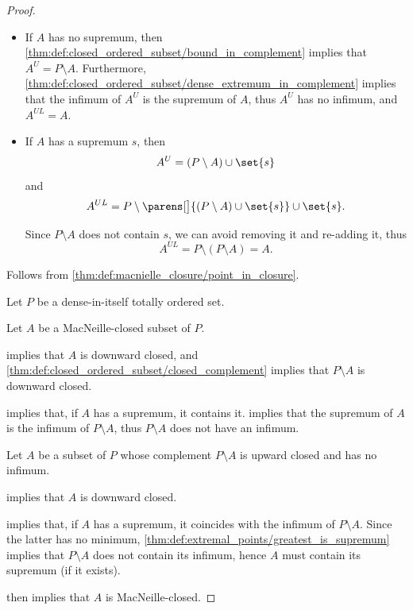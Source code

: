 \begin{proof}
  \begin{itemize}
    \item If \( A \) has no supremum, then \cref{thm:def:closed_ordered_subset/bound_in_complement} implies that \( A^U = P \setminus A \). Furthermore, \cref{thm:def:closed_ordered_subset/dense_extremum_in_complement} implies that the infimum of \( A^U \) is the supremum of \( A \), thus \( A^U \) has no infimum, and \( A^{UL} = A \).

    \item If \( A \) has a supremum \( s \), then
    \begin{equation*}
      A^U = (P \setminus A) \cup \set{ s }
    \end{equation*}
    and
    \begin{equation*}
      A^{UL}
      =
      P \setminus \parens[\big]{ (P \setminus A) \cup \set{ s } } \cup \set{ s }.
    \end{equation*}

    Since \( P \setminus A \) does not contain \( s \), we can avoid removing it and re-adding it, thus
    \begin{equation*}
      A^{UL} = P \setminus (P \setminus A) = A.
    \end{equation*}
  \end{itemize}

  Follows from \cref{thm:def:macnielle_closure/point_in_closure}.

   Let \( P \) be a dense-in-itself totally ordered set.

  \SufficiencySubProof* Let \( A \) be a MacNeille-closed subset of \( P \).

   implies that \( A \) is downward closed, and \cref{thm:def:closed_ordered_subset/closed_complement} implies that \( P \setminus A \) is downward closed.

   implies that, if \( A \) has a supremum, it contains it.  implies that the supremum of \( A \) is the infimum of \( P \setminus A \), thus \( P \setminus A \) does not have an infimum.

  \NecessitySubProof* Let \( A \) be a subset of \( P \) whose complement \( P \setminus A \) is upward closed and has no infimum.

   implies that \( A \) is downward closed.

   implies that, if \( A \) has a supremum, it coincides with the infimum of \( P \setminus A \). Since the latter has no minimum, \cref{thm:def:extremal_points/greatest_is_supremum} implies that \( P \setminus A \) does not contain its infimum, hence \( A \) must contain its supremum (if it exists).

   then implies that \( A \) is MacNeille-closed.
\end{proof}

